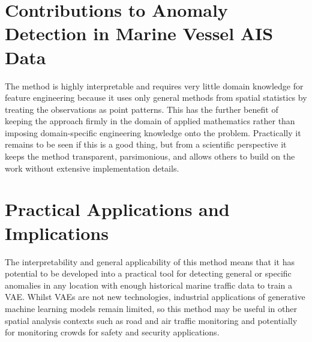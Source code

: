 \documentclass{mldsmsc}
\begin{document}
\section{Contributions to Anomaly Detection in Marine Vessel AIS Data}

The method is highly interpretable and requires very little domain knowledge for feature engineering because it uses only general methods from spatial statistics by treating  the observations as point patterns. This has the further benefit of keeping the approach firmly in the domain of applied mathematics rather than imposing domain-specific engineering knowledge onto the problem. Practically it remains to be seen if this is a good thing, but from a scientific perspective it keeps the method transparent, parsimonious, and allows others to build on the work without extensive implementation details. 

\section{Practical Applications and Implications}

The interpretability and general applicability of this method means that it has potential to be developed into a practical tool for detecting general or specific anomalies in any location with enough historical marine traffic data to train a VAE. Whilst VAEs are not new technologies, industrial applications of generative machine learning models remain limited, so this method may be useful in other spatial analysis contexts such as road and air traffic monitoring and potentially for monitoring crowds for safety and security applications. 

\clearpage
\renewcommand*{\thepage}{A\arabic{page}}

%
%




\end{document}
